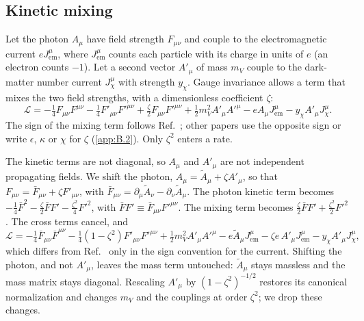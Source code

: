 \subsection{Kinetic mixing}

Let the photon $A_\mu$ have field strength $F_{\mu\nu}$ and couple to the electromagnetic current $eJ^\mu_{\mathrm{em}}$, where $J^\mu_{\mathrm{em}}$ counts each particle with its charge in units of $e$ (an electron counts $-1$). Let a second vector $A'_\mu$ of mass $m_V$ couple to the dark-matter number current $J^\mu_\chi$ with strength $y_\chi$. Gauge invariance allows a term that mixes the two field strengths, with a dimensionless coefficient $\zeta$:
\begin{equation}
  \mathcal{L} = -\tfrac14 F_{\mu\nu}F^{\mu\nu} - \tfrac14 F'_{\mu\nu}F'^{\mu\nu} + \tfrac{\zeta}{2}F_{\mu\nu}F'^{\mu\nu} + \tfrac12 m_V^2 A'_\mu A'^\mu - eA_\mu J^\mu_{\mathrm{em}} - y_\chi A'_\mu J^\mu_\chi .
  \label{eq:C.9-mix}
\end{equation}
The sign of the mixing term follows Ref.~\cite[Eq.~(70)]{lin2019tasi}; other papers use the opposite sign or write $\epsilon$, $\kappa$ or $\chi$ for $\zeta$ (\cref{app:B.2}). Only $\zeta^2$ enters a rate.

The kinetic terms are not diagonal, so $A_\mu$ and $A'_\mu$ are not independent propagating fields. We shift the photon, $A_\mu = \tilde A_\mu + \zeta A'_\mu$, so that $F_{\mu\nu} = \bar F_{\mu\nu} + \zeta F'_{\mu\nu}$, with $\bar F_{\mu\nu} = \partial_\mu\tilde A_\nu - \partial_\nu\tilde A_\mu$. The photon kinetic term becomes $-\tfrac14\bar F^2 - \tfrac{\zeta}{2}\bar F F' - \tfrac{\zeta^2}{4}F'^2$, with $\bar F F' \equiv \bar F_{\mu\nu}F'^{\mu\nu}$. The mixing term becomes $\tfrac{\zeta}{2}\bar F F' + \tfrac{\zeta^2}{2}F'^2$. The cross terms cancel, and
\begin{equation}
  \mathcal{L} = -\tfrac14\bar F_{\mu\nu}\bar F^{\mu\nu} - \tfrac14(1 - \zeta^2)F'_{\mu\nu}F'^{\mu\nu} + \tfrac12 m_V^2 A'_\mu A'^\mu - e\tilde A_\mu J^\mu_{\mathrm{em}} - \zeta e\, A'_\mu J^\mu_{\mathrm{em}} - y_\chi A'_\mu J^\mu_\chi ,
  \label{eq:C.9-mixed}
\end{equation}
which differs from Ref.~\cite[Eq.~(72)]{lin2019tasi} only in the sign convention for the current. Shifting the photon, and not $A'_\mu$, leaves the mass term untouched: $\tilde A_\mu$ stays massless and the mass matrix stays diagonal. Rescaling $A'_\mu$ by $(1 - \zeta^2)^{-1/2}$ restores its canonical normalization and changes $m_V$ and the couplings at order $\zeta^2$; we drop these changes.

